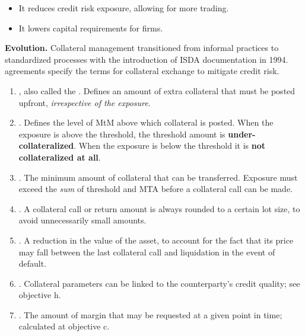 \begin{itemize}
\item It reduces credit risk exposure, allowing for more trading.
\item It lowers capital requirements for firms.
\end{itemize}

\textbf{Evolution.} Collateral management transitioned from informal practices to
standardized processes with the introduction of ISDA documentation in 1994.
 agreements specify the terms for collateral
exchange to mitigate credit risk.


\begin{enumerate}
\item {}, also called the . Defines an
amount of extra collateral that must be posted upfront, \emph{irrespective of the
exposure}.
\item {}. Defines the level of MtM above which collateral is posted.
When the exposure is above the threshold, the threshold amount is
\textbf{under-collateralized}. When the exposure is below the threshold it is
\textbf{not collateralized at all}.
\item {}. The minimum amount of collateral that
can be transferred. Exposure must exceed the \emph{sum} of threshold and MTA
before a collateral call can be made.
\item {}. A collateral call or return amount is always rounded to a
certain lot size, to avoid unnecessarily small amounts.
\item {}. A reduction in the value of the asset, to account for the
fact that its price may fall between the last collateral call and liquidation in
the event of default.
\item {}. Collateral parameters can be linked to the
counterparty's credit quality; see objective h.
\item {}. The amount of margin that may be requested at
a given point in time; calculated at objective c.
\end{enumerate}

